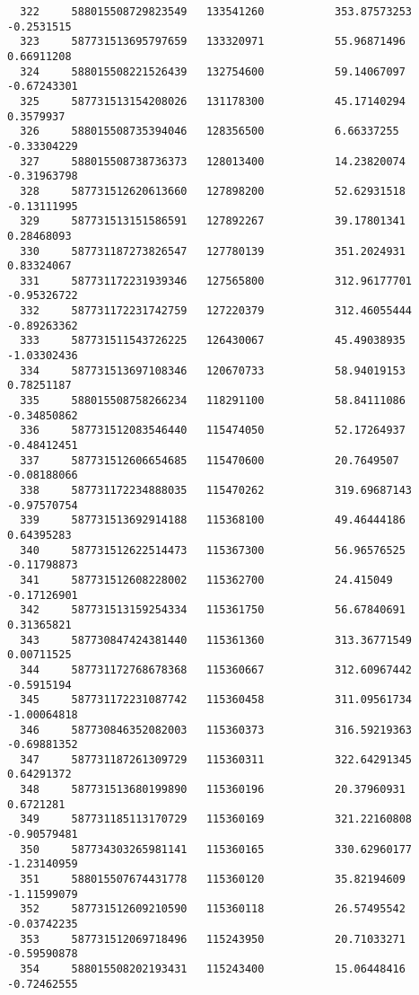 \documentclass[a4paper,11pt]{article}
\begin{document}
\begin{verbatim}
  322     588015508729823549   133541260           353.87573253   -0.2531515   
  323     587731513695797659   133320971           55.96871496    0.66911208   
  324     588015508221526439   132754600           59.14067097    -0.67243301  
  325     587731513154208026   131178300           45.17140294    0.3579937    
  326     588015508735394046   128356500           6.66337255     -0.33304229  
  327     588015508738736373   128013400           14.23820074    -0.31963798  
  328     587731512620613660   127898200           52.62931518    -0.13111995  
  329     587731513151586591   127892267           39.17801341    0.28468093   
  330     587731187273826547   127780139           351.2024931    0.83324067   
  331     587731172231939346   127565800           312.96177701   -0.95326722  
  332     587731172231742759   127220379           312.46055444   -0.89263362  
  333     587731511543726225   126430067           45.49038935    -1.03302436  
  334     587731513697108346   120670733           58.94019153    0.78251187   
  335     588015508758266234   118291100           58.84111086    -0.34850862  
  336     587731512083546440   115474050           52.17264937    -0.48412451  
  337     587731512606654685   115470600           20.7649507     -0.08188066  
  338     587731172234888035   115470262           319.69687143   -0.97570754  
  339     587731513692914188   115368100           49.46444186    0.64395283   
  340     587731512622514473   115367300           56.96576525    -0.11798873  
  341     587731512608228002   115362700           24.415049      -0.17126901  
  342     587731513159254334   115361750           56.67840691    0.31365821   
  343     587730847424381440   115361360           313.36771549   0.00711525   
  344     587731172768678368   115360667           312.60967442   -0.5915194   
  345     587731172231087742   115360458           311.09561734   -1.00064818  
  346     587730846352082003   115360373           316.59219363   -0.69881352  
  347     587731187261309729   115360311           322.64291345   0.64291372   
  348     587731513680199890   115360196           20.37960931    0.6721281    
  349     587731185113170729   115360169           321.22160808   -0.90579481  
  350     587734303265981141   115360165           330.62960177   -1.23140959  
  351     588015507674431778   115360120           35.82194609    -1.11599079  
  352     587731512609210590   115360118           26.57495542    -0.03742235  
  353     587731512069718496   115243950           20.71033271    -0.59590878  
  354     588015508202193431   115243400           15.06448416    -0.72462555  

\end{verbatim}
\end{document}
